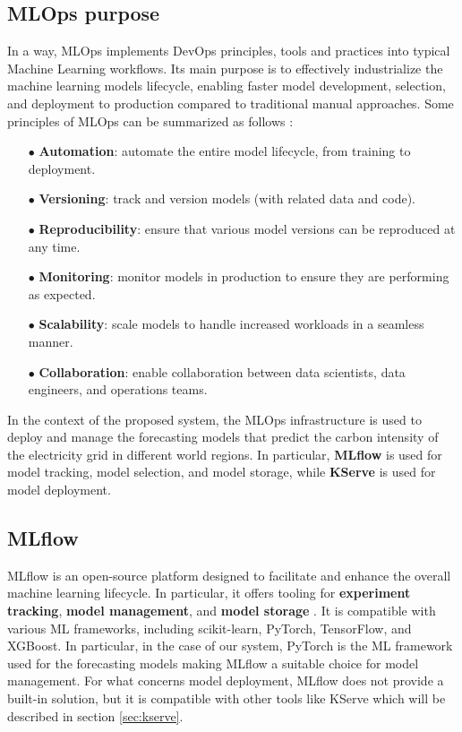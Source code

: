 \subsection{MLOps purpose}

In a way, MLOps implements DevOps principles, tools and practices into typical Machine Learning workflows.
Its main purpose is to effectively industrialize the machine learning models lifecycle, enabling faster model development, selection, and deployment to production compared to traditional manual approaches.
Some principles of MLOps can be summarized as follows \cite{mlops_ubuntu}:
\begin{itemize}[itemsep=0.2pt, topsep=1pt]
  \item[$\bullet$] \textbf{Automation}: automate the entire model lifecycle, from training to deployment.
  \item[$\bullet$] \textbf{Versioning}: track and version models (with related data and code).
  \item[$\bullet$] \textbf{Reproducibility}: ensure that various model versions can be reproduced at any time.
  \item[$\bullet$] \textbf{Monitoring}: monitor models in production to ensure they are performing as expected.
  \item[$\bullet$] \textbf{Scalability}: scale models to handle increased workloads in a seamless manner.
  \item[$\bullet$] \textbf{Collaboration}: enable collaboration between data scientists, data engineers, and operations teams.
\end{itemize}

In the context of the proposed system, the MLOps infrastructure is used to deploy and manage the forecasting models that predict the carbon intensity of the electricity grid in different world regions.
In particular, \textbf{MLflow} is used for model tracking, model selection, and model storage, while \textbf{KServe} is used for model deployment.

\subsection{MLflow}

MLflow is an open-source platform designed to facilitate and enhance the overall machine learning lifecycle. 
In particular, it offers tooling for \textbf{experiment tracking}, \textbf{model management}, and \textbf{model storage} \cite{mlflow_docs}.
It is compatible with various ML frameworks, including scikit-learn, PyTorch, TensorFlow, and XGBoost.
In particular, in the case of our system, PyTorch is the ML framework used for the forecasting models making MLflow a suitable choice for model management.
For what concerns model deployment, MLflow does not provide a built-in solution, but it is compatible with other tools like KServe which will be described in section \ref{sec:kserve}.

